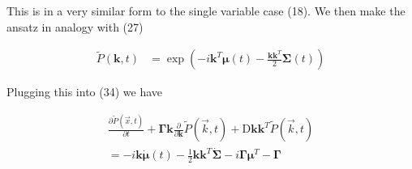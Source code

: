 \documentclass{article}
\begin{document}
This is in a very similar form to the single variable case (18). We then make the ansatz in analogy with (27)

\begin{align}
\tilde{P}(\bm{k},t) &= \exp\left(-i \bm{k}^{T} \bm{\mu}(t) -\frac{\bm{k}\bm{k}^{T}}{2}\bm{\Sigma}(t)\right)
\end{align}

Plugging this into (34) we have

\begin{align}
\frac{\partial \tilde{P}(\vec{x},t)}{\partial t}+ \bm{\Gamma}\bm{k}\frac{\partial}{\partial \bm{k}} \tilde{P}(\vec{k},t) + \bm{\mathrm{D}}\bm{k}\bm{k}^{T}\tilde{P}(\vec{k},t)\\
= -i\bm{k}\dot{\bm\mu}(t) - \frac{1}{2}\bm{k}\bm{k}^{T}\dot{\bm\Sigma}-i\bm\Gamma \bm\mu^{T} - \bm\Gamma
\end{align}
\end{document}
